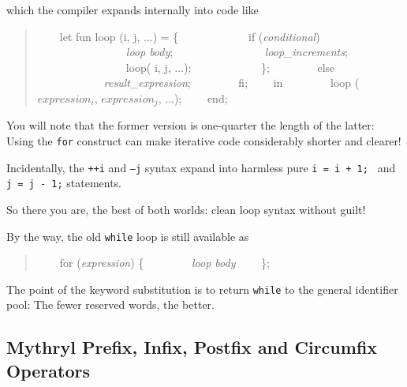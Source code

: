 which the compiler expands internally into code like
\begin{quotation}
~~~~let fun loop (i, j, ...) = \{ \newline
~~~~~~~~~~~~if ({\it conditional}) \newline
~~~~~~~~~~~~~~~~{\it loop body}; \newline
~~~~~~~~~~~~~~~~{\it loop\_increments}; \newline
~~~~~~~~~~~~~~~~loop( i, j, ...); \newline
~~~~~~~~~~~~\}; \newline
~~~~~~~~else \newline
~~~~~~~~~~~~{\it result\_expression}; \newline
~~~~~~~~fi; \newline
~~~~in \newline
~~~~~~~~loop ($expression_i$, $expression_j$, ...); \newline
~~~~end; \newline    
\end{quotation}

You will note that the former version is one-quarter the length 
of the latter:  Using the {\tt for} construct can make iterative 
code considerably shorter and clearer!

Incidentally, the {\tt ++i} and {\tt --j} syntax expand into harmless 
pure {\tt i = i + 1; } and {\tt j = j - 1;} statements.



So there you are, the best of both worlds:  clean loop syntax without guilt!

By the way, the old {\tt while} loop is still available as 

\begin{quotation}
~~~~for ({\it expression}) \{ \newline
~~~~~~~~{\it loop body} \newline
~~~~\}; \newline
\end{quotation}

The point of the keyword substitution is to return {\tt while} to 
the general identifier pool:  The fewer reserved words, the better.

\cutend*


\subsection{Mythryl Prefix, Infix, Postfix and Circumfix Operators}

